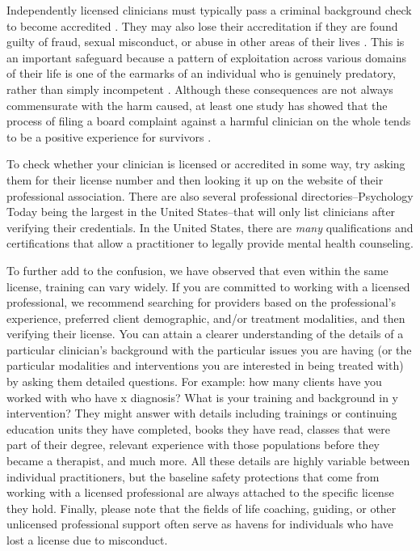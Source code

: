 \documentclass[12pt,letterpaper]{book}
\begin{document}
Independently licensed clinicians must typically pass a criminal background check to become accredited \cite{dunlap2021background}. They may also lose their accreditation if they are found guilty of fraud, sexual misconduct, or abuse in other areas of their lives \cite{barsky2023licensing}. This is an important safeguard because a pattern of exploitation across various domains of their life is one of the earmarks of an individual who is genuinely predatory, rather than simply incompetent \cite{cooke2001refining}. Although these consequences are not always commensurate with the harm caused, at least one study has showed that the process of filing a board complaint against a harmful clinician on the whole tends to be a positive experience for survivors \cite{vinson1987complaintProcedures}.

To check whether your clinician is licensed or accredited in some way, try asking them for their license number and then looking it up on the website of their professional association. There are also several professional directories–Psychology Today being the largest in the United States–that will only list clinicians after verifying their credentials. In the United States, there are \textit{many} qualifications and certifications that allow a practitioner to legally provide mental health counseling. 

To further add to the confusion, we have observed that even within the same license, training can vary widely. If you are committed to working with a licensed professional, we recommend searching for providers based on the professional's experience, preferred client demographic, and/or treatment modalities, and then verifying their license. You can attain a clearer understanding of the details of a particular clinician's background with the particular issues you are having (or the particular modalities and interventions you are interested in being treated with) by asking them detailed questions. For example: how many clients have you worked with who have x diagnosis? What is your training and background in y intervention? They might answer with details including trainings or continuing education units they have completed, books they have read, classes that were part of their degree, relevant experience with those populations before they became a therapist, and much more. All these details are highly variable between individual practitioners, but the baseline safety protections that come from working with a licensed professional are always attached to the specific license they hold. Finally, please note that the fields of life coaching, guiding, or other unlicensed professional support often serve as havens for individuals who have lost a license due to misconduct. 
\end{document}
